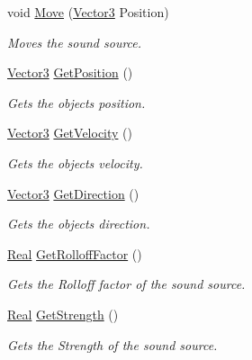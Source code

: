 \begin{DoxyCompactItemize}
void \hyperlink{classphys_1_1Sound_a62075a732f25c0a07b428c09c6232814}{Move} (\hyperlink{classphys_1_1Vector3}{Vector3} Position)
\begin{DoxyCompactList}\small\item\em Moves the sound source. \item\end{DoxyCompactList}\item 
\hyperlink{classphys_1_1Vector3}{Vector3} \hyperlink{classphys_1_1Sound_a6d7097965cb87491896f688a8ef12d45}{GetPosition} ()
\begin{DoxyCompactList}\small\item\em Gets the objects position. \item\end{DoxyCompactList}\item 
\hyperlink{classphys_1_1Vector3}{Vector3} \hyperlink{classphys_1_1Sound_a48e996b687ec11ff1d19400a010c4f07}{GetVelocity} ()
\begin{DoxyCompactList}\small\item\em Gets the objects velocity. \item\end{DoxyCompactList}\item 
\hyperlink{classphys_1_1Vector3}{Vector3} \hyperlink{classphys_1_1Sound_a228e07cbcf0c8fee7b0f1f86a0162484}{GetDirection} ()
\begin{DoxyCompactList}\small\item\em Gets the objects direction. \item\end{DoxyCompactList}\item 
\hyperlink{namespacephys_af7eb897198d265b8e868f45240230d5f}{Real} \hyperlink{classphys_1_1Sound_ab87182be43ed55e44acf7143a7b08213}{GetRolloffFactor} ()
\begin{DoxyCompactList}\small\item\em Gets the Rolloff factor of the sound source. \item\end{DoxyCompactList}\item 
\hyperlink{namespacephys_af7eb897198d265b8e868f45240230d5f}{Real} \hyperlink{classphys_1_1Sound_ab839e69523500591b40252e32bafbbb3}{GetStrength} ()
\begin{DoxyCompactList}\small\item\em Gets the Strength of the sound source. \item\end{DoxyCompactList}\item 

\end{DoxyCompactItemize}
